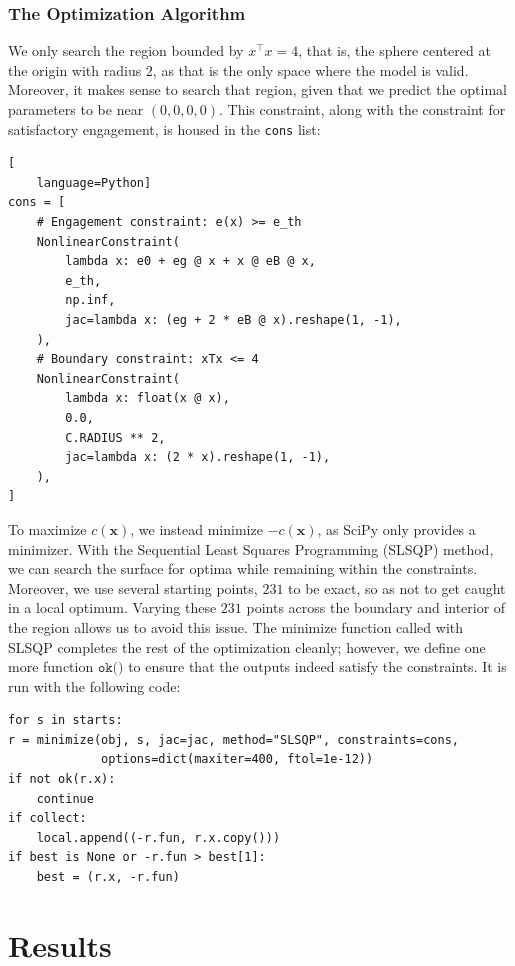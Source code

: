 \documentclass[12pt]{article}
\newcommand{\m}[1]{\mathbf{#1}}
\begin{document}
\subsubsection{The Optimization Algorithm}

We only search the region bounded by $x^\top x = 4$, that is, the sphere centered at the origin with radius $2$, as that is the only space where the model is valid. Moreover, it makes sense to search that region, given that we predict the optimal parameters to be near $(0,0,0,0)$. This constraint, along with the constraint for satisfactory engagement, is housed in the \texttt{cons} list:


\begin{lstlisting}[
    language=Python]
cons = [
    # Engagement constraint: e(x) >= e_th
    NonlinearConstraint(
        lambda x: e0 + eg @ x + x @ eB @ x,
        e_th,
        np.inf,
        jac=lambda x: (eg + 2 * eB @ x).reshape(1, -1),
    ),
    # Boundary constraint: xTx <= 4
    NonlinearConstraint(
        lambda x: float(x @ x),
        0.0,
        C.RADIUS ** 2,
        jac=lambda x: (2 * x).reshape(1, -1),
    ),
]

\end{lstlisting}
To maximize $c(\m x)$, we instead minimize $-c(\m x)$, as SciPy only provides a minimizer. With the Sequential Least Squares Programming (SLSQP) method, we can search the surface for optima while remaining within the constraints. Moreover, we use several starting points, $231$ to be exact, so as not to get caught in a local optimum. Varying these $231$ points across the boundary and interior of the region allows us to avoid this issue. The minimize function called with SLSQP completes the rest of the optimization cleanly; however, we define one more function $\texttt{ok()}$ to ensure that the outputs indeed satisfy the constraints. It is run with the following code:

\begin{lstlisting}
for s in starts:
r = minimize(obj, s, jac=jac, method="SLSQP", constraints=cons,
             options=dict(maxiter=400, ftol=1e-12))
if not ok(r.x):
    continue
if collect:
    local.append((-r.fun, r.x.copy()))
if best is None or -r.fun > best[1]:
    best = (r.x, -r.fun)
\end{lstlisting}

\section{Results}
\end{document}
